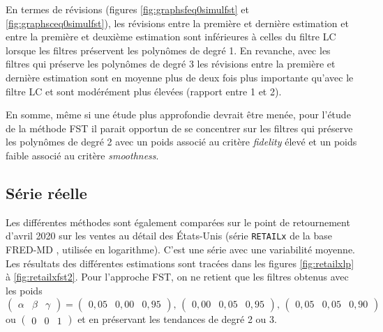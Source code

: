 \documentclass[
  12pt,
  french,
  12pt,a4paper]{article}
\newcommand\1{\mathds{1}}
\begin{document}
En termes de révisions (figures \ref{fig:graphsfeq0simulfst} et \ref{fig:graphsceq0simulfst}), les révisions entre la première et dernière estimation et entre la première et deuxième estimation sont inférieures à celles du filtre LC lorsque les filtres préservent les polynômes de degré 1. En revanche, avec les filtres qui préserve les polynômes de degré 3 les révisions entre la première et dernière estimation sont en moyenne plus de deux fois plus importante qu'avec le filtre LC et sont modérément plus élevées (rapport entre 1 et 2).

En somme, même si une étude plus approfondie devrait être menée, pour l'étude de la méthode FST il parait opportun de se concentrer sur les filtres qui préserve les polynômes de degré 2 avec un poids associé au critère \emph{fidelity} élevé et un poids faible associé au critère \emph{smoothness}.

\hypertarget{suxe9rie-ruxe9elle}{%
\subsection{Série réelle}\label{suxe9rie-ruxe9elle}}

Les différentes méthodes sont également comparées sur le point de retournement d'avril 2020 sur les ventes au détail des États-Unis (série \texttt{RETAILx} de la base FRED-MD \textcite{fredmd}, utilisée en logarithme).
C'est une série avec une variabilité moyenne.
Les résultats des différentes estimations sont tracées dans les figures \ref{fig:retailxlp} à \ref{fig:retailxfst2}.
Pour l'approche FST, on ne retient que les filtres obtenus avec les poids \(\begin{pmatrix}\alpha&\beta&\gamma\end{pmatrix} = \begin{pmatrix}0,05 &0,00&0,95\end{pmatrix},\, \begin{pmatrix}0,00 &0,05&0,95\end{pmatrix},\, \begin{pmatrix}0,05 &0,05&0,90\end{pmatrix}\) ou \(\begin{pmatrix}0 &0&1\end{pmatrix}\) et en préservant les tendances de degré 2 ou 3.
\end{document}
